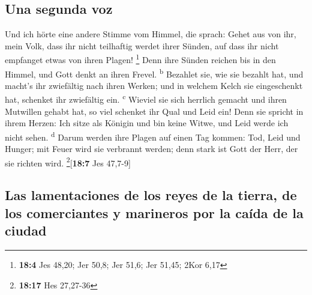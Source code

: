 \hypertarget{una-segunda-voz}{%
\subsection{Una segunda voz}\label{una-segunda-voz}}

 Und ich hörte eine andere Stimme vom Himmel, die sprach:
Gehet aus von ihr, mein Volk, dass ihr nicht teilhaftig werdet ihrer
Sünden, auf dass ihr nicht empfanget etwas von ihren Plagen! \footnote{\textbf{18:4}
  Jes 48,20; Jer 50,8; Jer 51,6; Jer 51,45; 2Kor 6,17} 
Denn ihre Sünden reichen bis in den Himmel, und Gott denkt an ihren
Frevel. \textsuperscript{b}  Bezahlet sie, wie sie bezahlt
hat, und macht's ihr zwiefältig nach ihren Werken; und in welchem Kelch
sie eingeschenkt hat, schenket ihr zwiefältig ein. \textsuperscript{c}
 Wieviel sie sich herrlich gemacht und ihren Mutwillen
gehabt hat, so viel schenket ihr Qual und Leid ein! Denn sie spricht in
ihrem Herzen: Ich sitze als Königin und bin keine Witwe, und Leid werde
ich nicht sehen. \textsuperscript{d}  Darum werden ihre
Plagen auf einen Tag kommen: Tod, Leid und Hunger; mit Feuer wird sie
verbrannt werden; denn stark ist Gott der Herr, der sie richten wird.
\footnote{\textbf{18:17} Hes 27,27-36}{[}\textbf{18:7} Jes 47,7-9{]}

\hypertarget{las-lamentaciones-de-los-reyes-de-la-tierra-de-los-comerciantes-y-marineros-por-la-cauxedda-de-la-ciudad}{%
\subsection{Las lamentaciones de los reyes de la tierra, de los
comerciantes y marineros por la caída de la
ciudad}\label{las-lamentaciones-de-los-reyes-de-la-tierra-de-los-comerciantes-y-marineros-por-la-cauxedda-de-la-ciudad}}

